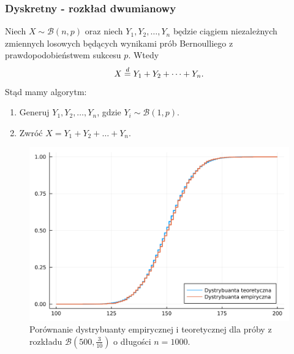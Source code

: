 \documentclass[12pt]{mwrep}
\begin{document}
	\subsubsection{Dyskretny - rozkład dwumianowy}
	\noindent Niech $ X \sim \mathcal{B}(n, p) $ oraz niech $Y_1, Y_2, \dots, Y_n$ będzie ciągiem niezależnych zmiennych losowych będących wynikami prób Bernoulliego z prawdopodobieństwem sukcesu $p$. Wtedy
	$$ X \buildrel{d} \over{=} Y_1 + Y_2 + \dots + Y_n. $$
	Stąd mamy algorytm:
	\begin{enumerate}[leftmargin=10mm]
		\item Generuj $ Y_1, Y_2, \dots, Y_n $, gdzie $Y_i \sim \mathcal{B}(1, p) $.
		\item Zwróć $ X = Y_1 + Y_2 + \dots + Y_n $.
	\end{enumerate}
	\begin{figure}[H]
		\centering
		\caption{Porównanie dystrybuanty empirycznej i teoretycznej dla próby z rozkładu $\mathcal{B}(500, \frac{3}{10})$ o długości $n = 1000$.}
		\includegraphics[scale=0.1]{fig/fig_splot1.png}
	\end{figure}
	
\end{document}
